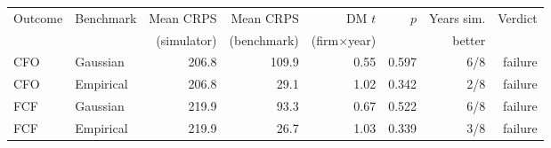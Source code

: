 \begin{tabular}{llrrrrrr}
\toprule
Outcome & Benchmark & Mean CRPS & Mean CRPS & DM $t$ & $p$ & Years sim. & Verdict \\
 & & (simulator) & (benchmark) & (firm$\times$year) & & better & \\
\midrule
CFO & Gaussian & 206.8 & 109.9 & 0.55 & 0.597 & 6/8 & failure \\
CFO & Empirical & 206.8 & 29.1 & 1.02 & 0.342 & 2/8 & failure \\
FCF & Gaussian & 219.9 & 93.3 & 0.67 & 0.522 & 6/8 & failure \\
FCF & Empirical & 219.9 & 26.7 & 1.03 & 0.339 & 3/8 & failure \\
\bottomrule
\end{tabular}

